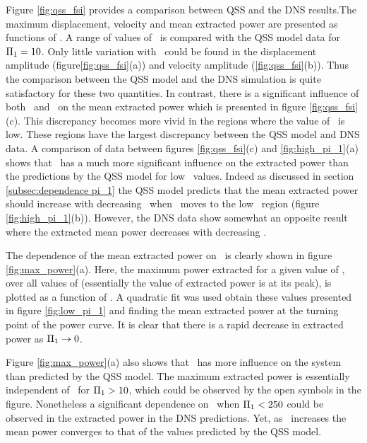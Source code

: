   

Figure \ref{fig:qss_fsi} provides a comparison between QSS and the DNS results.The maximum displacement, velocity and mean extracted power are presented as  functions of \massdamp. A range of values of \massstiff\ is compared with the QSS model data for $\Pi_1 = 10$. Only little variation with \massstiff\ could be found in  the displacement amplitude (figure\ref{fig:qss_fsi}(a)) and velocity amplitude (\ref{fig:qss_fsi}(b)). Thus the comparison between the QSS model and the DNS simulation is quite satisfactory for these two quantities. In contrast, there is a significant influence of both \massstiff\ and \massdamp\ on the mean extracted power which is  presented in figure \ref{fig:qss_fsi}(c). This discrepancy becomes more vivid in the regions where the value of \massstiff\ is low. These regions have the largest discrepancy between the QSS model and DNS data. A comparison of data between figures \ref{fig:qss_fsi}(c) and \ref{fig:high_pi_1}(a) shows that \massstiff\ has a much more significant influence on the extracted power than the predictions by the QSS model for low \massstiff\ values. Indeed as discussed in section \ref{subsec:dependence pi_1} the QSS model predicts that the mean extracted power should increase with decreasing \massstiff\ when \massstiff\ moves to the low \massstiff\ region (figure \ref{fig:high_pi_1}(b)). However, the DNS data show somewhat an opposite result where the extracted mean power decreases with decreasing \massstiff.






The dependence of the mean extracted power on \massstiff\ is clearly shown in figure \ref{fig:max_power}(a).  Here, the maximum power extracted for a given value of \massstiff, over all values of \massdamp (essentially the value of extracted power is at its peak), is plotted as a function of \massstiff. A quadratic fit was used obtain these values presented in figure \ref{fig:low_pi_1} and finding the mean extracted power at the turning point of the power curve. It is clear that there is a rapid decrease in extracted power as $\Pi_1 \rightarrow 0$. 



Figure \ref{fig:max_power}(a) also shows that \massstiff\ has more influence on the system  than predicted by the QSS model. The maximum extracted power is essentially independent of \massstiff\ for $\Pi_1>10$, which could be observed by the open symbols in the figure. Nonetheless a significant dependence on \massstiff\, when  $\Pi_1<250$ could be observed in the extracted power in the DNS predictions. Yet, as \massstiff\ increases the mean power converges to that of the values predicted by the QSS model.

